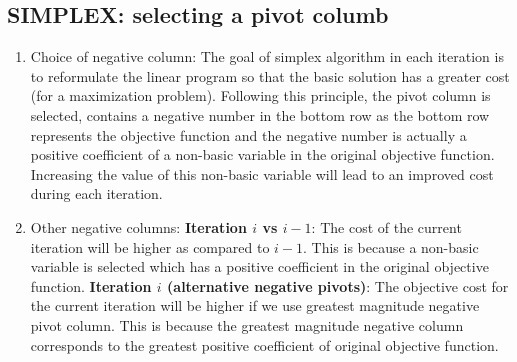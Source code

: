 \documentclass{acm_proc_article-sp}
\begin{document}
\subsection{SIMPLEX: selecting a pivot columb}

\begin{enumerate}
  \item Choice of negative column: The goal of simplex algorithm in each iteration
    is to reformulate the linear program so that the basic solution has a greater
    cost (for a maximization problem). Following this principle, the pivot column
    is selected, contains a negative number in the bottom row as the bottom row
    represents the objective function and the negative number is actually a positive
    coefficient of a non-basic variable in the original objective function.
    Increasing the value of this non-basic variable will lead to an improved cost
    during each iteration.
  \item Other negative columns:
    {\bf Iteration $i$ vs $i-1$}: The cost of the current iteration will be higher as compared
    to $i-1$. This is because a non-basic variable is selected which has a
    positive coefficient in the original objective function.
    {\bf Iteration $i$ (alternative negative pivots)}: The objective cost for the
    current iteration will be higher if we use greatest magnitude negative pivot
    column. This is because the greatest magnitude negative column corresponds to
    the greatest positive coefficient of original objective function.
\end{enumerate}

%
%
\end{document}

